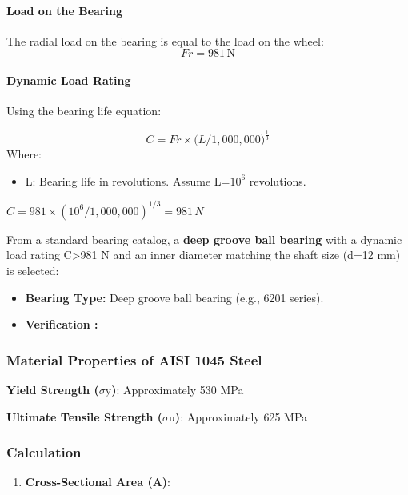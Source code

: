 \documentclass[../../main]{subfiles}
\begin{document}
\paragraph{ Load on the Bearing}

The radial load on the bearing is equal to the load on the wheel:
$$Fr = 981\, \text{N}$$

\paragraph{Dynamic Load Rating}

Using the bearing life equation:

$$C = Fr \times (L/1,000,00{0)}^{\frac{1}{3}}$$
Where:

\begin{itemize}
\item
  L: Bearing life in revolutions. Assume L=\(10^{6}\) revolutions.
\end{itemize}

\(C = 981 \times (10^{6}/1,000,000)^{1/3} = 981\, N\)

From a standard bearing catalog, a \textbf{deep groove ball bearing}
with a dynamic load rating C\textgreater981 N and an inner diameter
matching the shaft size (d=12 mm) is selected:

\begin{itemize}
\item
  \textbf{Bearing Type:} Deep groove ball bearing (e.g., 6201 series).
\item
  \textbf{Verification :}
\end{itemize}

\subsubsection{Material Properties of AISI 1045 Steel}

\textbf{Yield Strength (}$\sigma$y\textbf{)}: Approximately 530 MPa

\textbf{Ultimate Tensile Strength (}$\sigma$u\textbf{)}: Approximately 625 MPa

\subsubsection{Calculation}

\begin{enumerate}
\def\labelenumi{\arabic{enumi}.}
\item
  \textbf{Cross-Sectional Area (A)}:
\end{enumerate}
\end{document}

